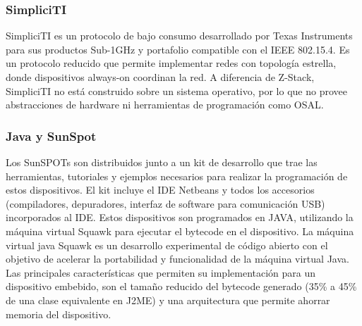 \subsubsection{SimpliciTI}
SimpliciTI es un protocolo de bajo consumo desarrollado por Texas Instruments 	para sus productos Sub-1GHz y portafolio compatible con el IEEE 802.15.4. Es un protocolo reducido que permite implementar redes con topología estrella, donde dispositivos always-on  coordinan la red. A diferencia de Z-Stack, SimpliciTI no está construido sobre un sistema operativo, por lo que no provee abstracciones de hardware ni herramientas de programación como OSAL.	

\subsubsection{Java y SunSpot}
Los SunSPOTs son distribuidos junto a un kit de desarrollo que trae las herramientas, tutoriales y ejemplos necesarios para realizar la programación de estos dispositivos. El kit incluye el IDE Netbeans y todos los accesorios (compiladores, depuradores, interfaz de software para comunicación USB) incorporados al IDE. Estos dispositivos son programados en JAVA, utilizando la máquina virtual Squawk para ejecutar el bytecode en el dispositivo. La máquina virtual java Squawk es un desarrollo experimental de código abierto con el objetivo de acelerar la portabilidad y funcionalidad de la máquina virtual Java. Las principales características que permiten su implementación para un dispositivo embebido, son el tamaño reducido del bytecode generado (35\%  a 45\% de una clase equivalente en J2ME)  y una arquitectura que permite ahorrar memoria del dispositivo.






